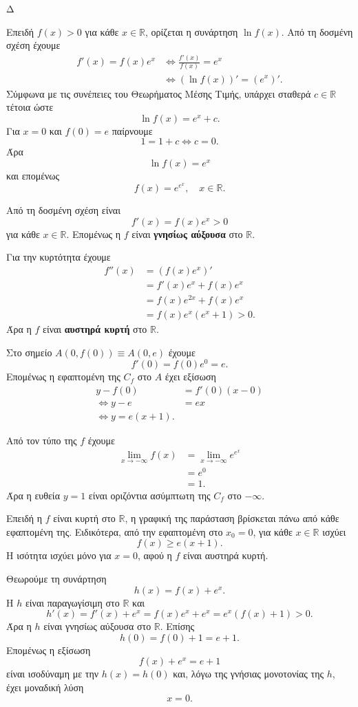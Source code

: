 \begin{thema}{Δ}
\begin{erwthma}
\item Επειδή $f(x)>0$ για κάθε $x\in\mathbb{R}$, ορίζεται η συνάρτηση $\ln f(x)$. Από τη δοσμένη σχέση έχουμε
\begin{align*}
f'(x)=f(x)e^x
&\Leftrightarrow \frac{f'(x)}{f(x)}=e^x\\
&\Leftrightarrow (\ln f(x))'=(e^x)'.
\end{align*}
Σύμφωνα με τις συνέπειες του Θεωρήματος Μέσης Τιμής, υπάρχει σταθερά $c\in\mathbb{R}$ τέτοια ώστε
\[
\ln f(x)=e^x+c.
\]
Για $x=0$ και $f(0)=e$ παίρνουμε
\[
1=1+c\Leftrightarrow c=0.
\]
Άρα
\[
\ln f(x)=e^x
\]
και επομένως
\[
{f(x)=e^{e^x}},
\quad x\in\mathbb{R}.
\]

\item Από τη δοσμένη σχέση είναι
\[
f'(x)=f(x)e^x>0
\]
για κάθε $x\in\mathbb{R}$. Επομένως η $f$ είναι \textbf{γνησίως αύξουσα} στο $\mathbb{R}$.

Για την κυρτότητα έχουμε
\begin{align*}
f''(x)
&=\left(f(x)e^x\right)'\\
&=f'(x)e^x+f(x)e^x\\
&=f(x)e^{2x}+f(x)e^x\\
&=f(x)e^x(e^x+1)>0.
\end{align*}
Άρα η $f$ είναι \textbf{αυστηρά κυρτή} στο $\mathbb{R}$.

Στο σημείο $A(0,f(0))\equiv A(0,e)$ έχουμε
\[
f'(0)=f(0)e^0=e.
\]
Επομένως η εφαπτομένη της $C_f$ στο $A$ έχει εξίσωση
\begin{align*}
y-f(0)&=f'(0)(x-0)\\
\Leftrightarrow y-e&=ex\\
\Leftrightarrow {y=e(x+1)}.
\end{align*}

\item Από τον τύπο της $f$ έχουμε
\begin{align*}
\lim_{x\to-\infty}f(x)
&=\lim_{x\to-\infty}e^{e^x}\\
&=e^0\\
&={1}.
\end{align*}
Άρα η ευθεία $y=1$ είναι οριζόντια ασύμπτωτη της $C_f$ στο $-\infty$.

Επειδή η $f$ είναι κυρτή στο $\mathbb{R}$, η γραφική της παράσταση βρίσκεται πάνω από κάθε εφαπτομένη της. Ειδικότερα, από την εφαπτομένη στο $x_0=0$, για κάθε $x\in\mathbb{R}$ ισχύει
\[
{f(x)\geq e(x+1)}.
\]
Η ισότητα ισχύει μόνο για $x=0$, αφού η $f$ είναι αυστηρά κυρτή.

\item Θεωρούμε τη συνάρτηση
\[
h(x)=f(x)+e^x.
\]
Η $h$ είναι παραγωγίσιμη στο $\mathbb{R}$ και
\[
h'(x)=f'(x)+e^x=f(x)e^x+e^x=e^x(f(x)+1)>0.
\]
Άρα η $h$ είναι γνησίως αύξουσα στο $\mathbb{R}$. Επίσης
\[
h(0)=f(0)+1=e+1.
\]
Επομένως η εξίσωση
\[
f(x)+e^x=e+1
\]
είναι ισοδύναμη με την $h(x)=h(0)$ και, λόγω της γνήσιας μονοτονίας της $h$, έχει μοναδική λύση
\[
{x=0}.
\]
\end{erwthma}
\end{thema}

